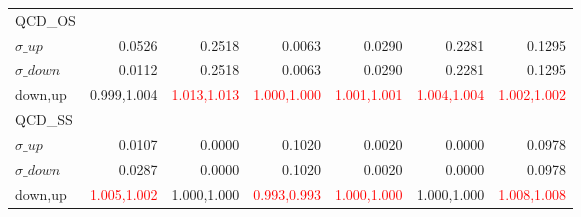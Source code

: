 \documentclass[11pt,oneside,a4paper]{article}
\begin{document}
\begin{table}
\begin{tabular}{lrrrrrr}
\hline
QCD\_OS &  &  &  &  &  &  \\
$\sigma\_up$ & 0.0526 & 0.2518 & 0.0063 & 0.0290 & 0.2281 & 0.1295 \\
$\sigma\_down$ & 0.0112 & 0.2518 & 0.0063 & 0.0290 & 0.2281 & 0.1295 \\
down,up & 0.999,1.004 & \textcolor{red}{1.013,1.013} & \textcolor{red}{1.000,1.000} & \textcolor{red}{1.001,1.001} & \textcolor{red}{1.004,1.004} & \textcolor{red}{1.002,1.002} \\

\hline
QCD\_SS &  &  &  &  &  &  \\
$\sigma\_up$ & 0.0107 & 0.0000 & 0.1020 & 0.0020 & 0.0000 & 0.0978 \\
$\sigma\_down$ & 0.0287 & 0.0000 & 0.1020 & 0.0020 & 0.0000 & 0.0978 \\
down,up & \textcolor{red}{1.005,1.002} & 1.000,1.000 & \textcolor{red}{0.993,0.993} & \textcolor{red}{1.000,1.000} & 1.000,1.000 & \textcolor{red}{1.008,1.008} \\

\hline
\end{tabular}
\end{table}
\end{document}
